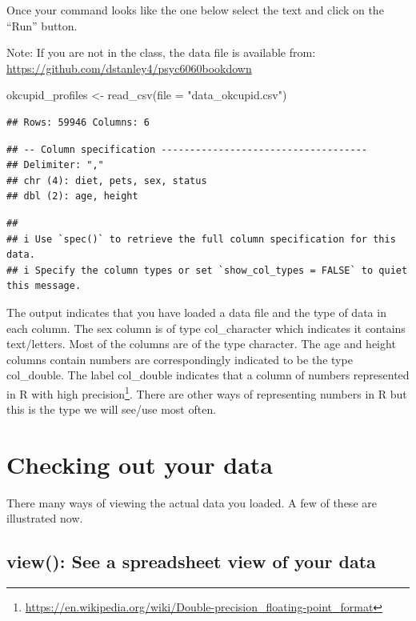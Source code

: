 \documentclass[
]{krantz}
\makeatletter
\newenvironment{Shaded}{\begin{snugshade}}{\end{snugshade}}
\newcommand{\AttributeTok}[1]{\textcolor[rgb]{0.61,0.61,0.61}{#1}}
\newcommand{\FunctionTok}[1]{\textcolor[rgb]{0,0,0}{#1}}
\newcommand{\NormalTok}[1]{#1}
\newcommand{\OtherTok}[1]{\textcolor[rgb]{0.37,0.37,0.37}{#1}}
\newcommand{\StringTok}[1]{\textcolor[rgb]{0.5,0.5,0.5}{#1}}
\renewcommand{\href}[2]{#2\footnote{\url{#1}}}
\newenvironment{kframe}{%
\medskip{}
\setlength{\fboxsep}{.8em}
 \def\at@end@of@kframe{}%
 \ifinner\ifhmode%
  \def\at@end@of@kframe{\end{minipage}}%
  \begin{minipage}{\columnwidth}%
 \fi\fi%
 \def\FrameCommand##1{\hskip\@totalleftmargin \hskip-\fboxsep
 \colorbox{shadecolor}{##1}\hskip-\fboxsep
     \hskip-\linewidth \hskip-\@totalleftmargin \hskip\columnwidth}%
 \MakeFramed {\advance\hsize-\width
   \@totalleftmargin\z@ \linewidth\hsize
   \@setminipage}}%
 {\par\unskip\endMakeFramed%
 \at@end@of@kframe}
\renewenvironment{Shaded}{\begin{kframe}}{\end{kframe}}
\makeatother
\begin{document}
Once your command looks like the one below select the text and click on the ``Run'' button.

Note: If you are not in the class, the data file is available from: \url{https://github.com/dstanley4/psyc6060bookdown}

\begin{Shaded}
\begin{Highlighting}[]
\NormalTok{okcupid\_profiles }\OtherTok{\textless{}{-}} \FunctionTok{read\_csv}\NormalTok{(}\AttributeTok{file =} \StringTok{"data\_okcupid.csv"}\NormalTok{)}
\end{Highlighting}
\end{Shaded}

\begin{verbatim}
## Rows: 59946 Columns: 6
\end{verbatim}

\begin{verbatim}
## -- Column specification ------------------------------------
## Delimiter: ","
## chr (4): diet, pets, sex, status
## dbl (2): age, height
\end{verbatim}

\begin{verbatim}
## 
## i Use `spec()` to retrieve the full column specification for this data.
## i Specify the column types or set `show_col_types = FALSE` to quiet this message.
\end{verbatim}

The output indicates that you have loaded a data file and the type of data in each column. The sex column is of type col\_character which indicates it contains text/letters. Most of the columns are of the type character. The age and height columns contain numbers are correspondingly indicated to be the type col\_double. The label col\_double indicates that a column of numbers represented in R with \href{https://en.wikipedia.org/wiki/Double-precision_floating-point_format}{high precision}. There are other ways of representing numbers in R but this is the type we will see/use most often.

\hypertarget{checking-out-your-data}{%
\section{Checking out your data}\label{checking-out-your-data}}

There many ways of viewing the actual data you loaded. A few of these are illustrated now.

\hypertarget{view-see-a-spreadsheet-view-of-your-data}{%
\subsection{view(): See a spreadsheet view of your data}\label{view-see-a-spreadsheet-view-of-your-data}}
\end{document}
